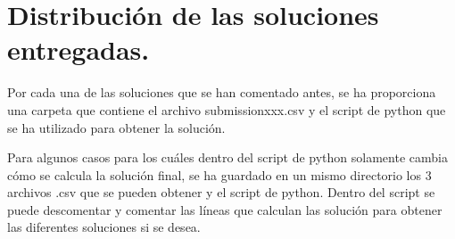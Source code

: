 	\section{Distribución de las soluciones entregadas.}
	Por cada una de las soluciones que se han comentado antes, se ha proporciona una carpeta que contiene el archivo submissionxxx.csv y el script de python que se ha utilizado para obtener la solución.
	
	\vspace{0.06in}
	Para algunos casos para los cuáles dentro del script de python solamente cambia cómo se calcula la solución final, se ha guardado en un mismo directorio los 3 archivos .csv que se pueden obtener y el script de python. Dentro del script se puede descomentar y comentar las líneas que calculan las solución para obtener las diferentes soluciones si se desea.


